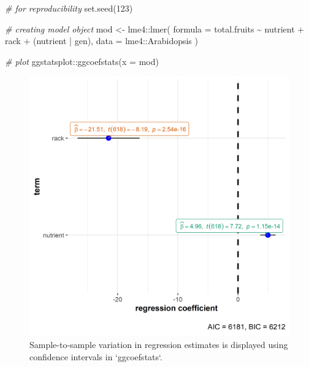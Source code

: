 \documentclass[
]{article}
\newenvironment{Shaded}{\begin{snugshade}}{\end{snugshade}}
\newcommand{\AttributeTok}[1]{\textcolor[rgb]{0.77,0.63,0.00}{#1}}
\newcommand{\CommentTok}[1]{\textcolor[rgb]{0.56,0.35,0.01}{\textit{#1}}}
\newcommand{\DecValTok}[1]{\textcolor[rgb]{0.00,0.00,0.81}{#1}}
\newcommand{\FunctionTok}[1]{\textcolor[rgb]{0.00,0.00,0.00}{#1}}
\newcommand{\NormalTok}[1]{#1}
\newcommand{\OtherTok}[1]{\textcolor[rgb]{0.56,0.35,0.01}{#1}}
\newcommand{\SpecialCharTok}[1]{\textcolor[rgb]{0.00,0.00,0.00}{#1}}
\begin{document}
\begin{Shaded}
\begin{Highlighting}[]
\CommentTok{\# for reproducibility}
\FunctionTok{set.seed}\NormalTok{(}\DecValTok{123}\NormalTok{)}

\CommentTok{\# creating model object}
\NormalTok{mod }\OtherTok{\textless{}{-}}\NormalTok{ lme4}\SpecialCharTok{::}\FunctionTok{lmer}\NormalTok{(}
  \AttributeTok{formula =}\NormalTok{ total.fruits }\SpecialCharTok{\textasciitilde{}}\NormalTok{ nutrient }\SpecialCharTok{+}\NormalTok{ rack }\SpecialCharTok{+}\NormalTok{ (nutrient }\SpecialCharTok{|}\NormalTok{ gen),}
  \AttributeTok{data =}\NormalTok{ lme4}\SpecialCharTok{::}\NormalTok{Arabidopsis}
\NormalTok{)}

\CommentTok{\# plot}
\NormalTok{ggstatsplot}\SpecialCharTok{::}\FunctionTok{ggcoefstats}\NormalTok{(}\AttributeTok{x =}\NormalTok{ mod)}
\end{Highlighting}
\end{Shaded}

\begin{figure}[H]
\includegraphics[width=1\linewidth]{./figures/paper-fig6-1} \caption{Sample-to-sample variation in regression estimates is displayed using confidence intervals in `ggcoefstats`.}\label{fig:fig6}
\end{figure}
\end{document}
